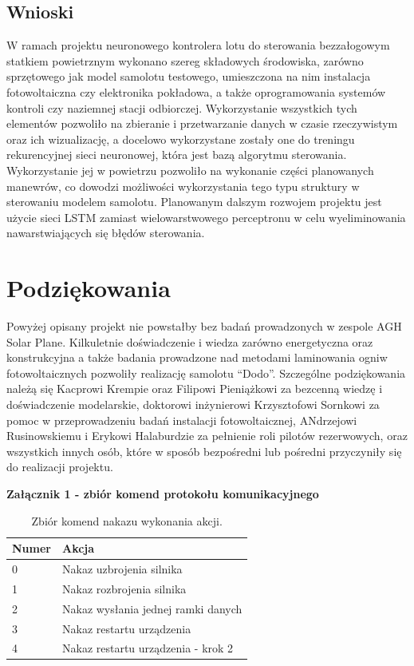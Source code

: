\documentclass[12pt, a4paper]{article}
\begin{document}
\subsection{Wnioski}
W ramach projektu neuronowego kontrolera lotu do sterowania bezzałogowym statkiem powietrznym wykonano szereg składowych środowiska, zarówno sprzętowego jak model samolotu testowego, umieszczona na nim instalacja fotowoltaiczna czy elektronika pokładowa, a także oprogramowania systemów kontroli czy naziemnej stacji odbiorczej. Wykorzystanie wszystkich tych elementów pozwoliło na zbieranie i przetwarzanie danych w czasie rzeczywistym oraz ich wizualizację, a docelowo wykorzystane zostały one do treningu rekurencyjnej sieci neuronowej, która jest bazą algorytmu sterowania. Wykorzystanie jej w powietrzu pozwoliło na wykonanie części planowanych manewrów, co dowodzi możliwości wykorzystania tego typu struktury w sterowaniu modelem samolotu. Planowanym dalszym rozwojem projektu jest użycie sieci LSTM zamiast wielowarstwowego perceptronu w celu wyeliminowania nawarstwiających się błędów sterowania.

\clearpage
\section*{Podziękowania}
Powyżej opisany projekt nie powstałby bez badań prowadzonych w zespole AGH Solar Plane. Kilkuletnie doświadczenie i wiedza zarówno energetyczna oraz konstrukcyjna a także badania prowadzone nad metodami laminowania ogniw fotowoltaicznych pozwoliły realizację samolotu ``Dodo''. Szczególne podziękowania należą się Kacprowi Krempie oraz Filipowi Pieniążkowi za bezcenną wiedzę i doświadczenie modelarskie, doktorowi inżynierowi Krzysztofowi Sornkowi za pomoc w przeprowadzeniu badań instalacji fotowoltaicznej, ANdrzejowi Rusinowskiemu i Erykowi Halaburdzie za pełnienie roli pilotów rezerwowych, oraz wszystkich innych osób, które w sposób bezpośredni lub pośredni przyczyniły się do realizacji projektu.

\clearpage

\begin{center}
\textbf{Załącznik 1 - zbiór komend protokołu komunikacyjnego}
\end{center}

\begin{table}[H]
\centering
\begin{tabular}{| l | l |}
\hline
\textbf{Numer} & \textbf{Akcja} \\
\hline
0 & Nakaz uzbrojenia silnika \\
\hline
1 & Nakaz rozbrojenia silnika \\
\hline
2 & Nakaz wysłania jednej ramki danych \\
\hline
3 & Nakaz restartu urządzenia \\
\hline
4 & Nakaz restartu urządzenia - krok 2 \\
\hline

\end{tabular}
\caption{Zbiór komend nakazu wykonania akcji.}
\end{table}
\end{document}
